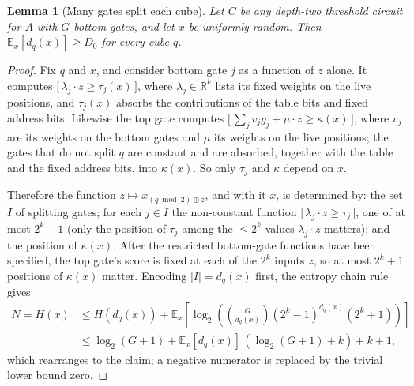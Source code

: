 \documentclass[11pt,letterpaper]{article}
\newtheorem{lemma}[theorem]{Lemma}
\theoremstyle{remark}
\newcommand{\ind}[1]{\bigl[\,#1\,\bigr]}
\begin{document}
\begin{lemma}[Many gates split each cube]\label{lem:entropy}
Let $C$ be any depth-two threshold circuit for $A$ with $G$ bottom gates, and
let $x$ be uniformly random. Then $\mathbb E_x[d_q(x)]\ge D_0$ for every cube
$q$.
\end{lemma}
\begin{proof}
Fix $q$ and $x$, and consider bottom gate $j$ as a function of $z$ alone.
It computes $\ind{\lambda_j\cdot z\ge\tau_j(x)}$, where
$\lambda_j\in\mathbb R^k$ lists its fixed weights on the live positions,
and $\tau_j(x)$ absorbs the contributions of the table bits and fixed
address bits.
Likewise the top gate computes
$\ind{\sum_jv_jg_j+\mu\cdot z\ge\kappa(x)}$, where $v_j$ are its weights on the
bottom gates and $\mu$ its weights on the live positions; the gates that
do not split $q$ are constant and are absorbed, together with the table and
the fixed address bits, into $\kappa(x)$. So only $\tau_j$ and $\kappa$ depend
on $x$.

Therefore the function $z\mapsto x_{(q\bmod2)\oplus z}$, and with it $x$, is
determined by: the set $I$ of splitting gates; for each $j\in I$ the
non-constant function $\ind{\lambda_j\cdot z\ge\tau_j}$, one of at most $2^k-1$
(only the position of $\tau_j$ among the $\le2^k$ values $\lambda_j\cdot z$
matters); and the position of $\kappa(x)$. After the restricted bottom-gate
functions have been specified, the top gate's score is fixed at each of the
$2^k$ inputs $z$, so at most $2^k+1$ positions of $\kappa(x)$ matter.
Encoding $|I|=d_q(x)$ first, the entropy chain rule gives
\[
\begin{aligned}
N=H(x)&\le H(d_q(x))+\mathbb E_x\!\left[\log_2\!\left(
\binom{G}{d_q(x)}(2^k-1)^{d_q(x)}(2^k+1)\right)\right]\\
&\le\log_2(G+1)+\mathbb E_x[d_q(x)]\,(\log_2(G+1)+k)+k+1,
\end{aligned}
\]
which rearranges to the claim; a negative numerator is replaced by the
trivial lower bound zero.
\end{proof}
\end{document}
